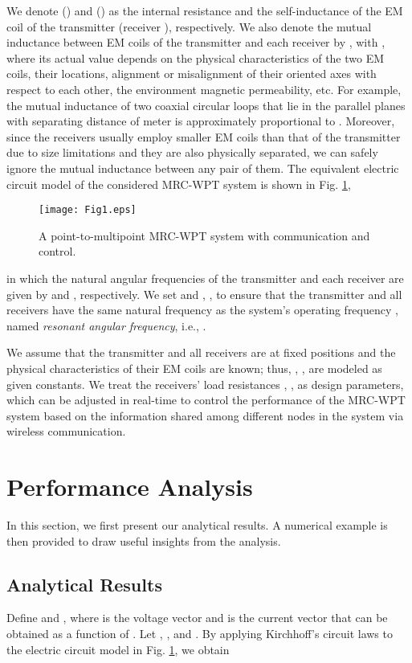 \documentclass[onecolumn, a4size, 11pt]{IEEEtran}
\begin{document}
We denote   ()  and  ()  as the internal resistance and the self-inductance of the EM coil of the transmitter (receiver ), respectively. 
We  also denote  the mutual inductance between  EM  coils of the transmitter  and each receiver  by , with ,  where its  actual value depends on  the physical characteristics of the two EM  coils,  their locations, alignment or misalignment of their oriented axes with respect to each other,  the environment magnetic permeability, etc.  For example, the mutual inductance  of two coaxial circular loops  that lie in the parallel planes with separating distance of  meter is approximately proportional to  \cite{Cheng}.  
Moreover, since the receivers usually employ smaller EM coils than  that of the transmitter due to size limitations and they are also physically  separated,  we can safely ignore  the mutual inductance  between any pair  of them. The equivalent electric circuit model of the considered MRC-WPT system is shown in Fig. \ref{fig:ElecCirtuit},
\begin{figure} [t]
\centering
\texttt{[image: Fig1.eps]}
\caption{A point-to-multipoint MRC-WPT system with communication and control.}
\label{fig:ElecCirtuit} 
\end{figure} 
in which the natural angular frequencies of the transmitter and  each receiver  are given by   and , respectively. 
We  set   and 
, , to ensure that the transmitter and all receivers have the same natural  frequency as   the system's  operating frequency , named \textit{resonant angular frequency}, i.e.,  .  

We assume that  the transmitter and all receivers are at fixed positions and the physical characteristics of their EM coils are known; thus,  , , are modeled as given constants. 
We treat the receivers' load  resistances , , as  design parameters, which can be adjusted in real-time \cite{Garnica} to control the performance of the MRC-WPT system based on the information shared among different nodes in the system via  wireless communication.  
\section{Performance Analysis}  \label{sec:Performance}
In this section, we first present  our analytical results. 
A numerical example is then provided  to draw useful insights from the  analysis.
\subsection{Analytical Results}
Define  and , where  is the  voltage vector  and  is the current vector that can be obtained as a function of . 
Let , , and .
By applying Kirchhoff's circuit laws to the electric circuit model  in Fig. \ref{fig:ElecCirtuit}, we obtain 
\end{document}
